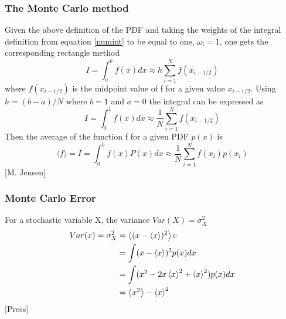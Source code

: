 \documentclass[%
reprint,
amsmath,amssymb,
aps,
]{revtex4-1}
\begin{document}
\subsubsection*{The Monte Carlo method} \noindent 
Given the above definition of the PDF and taking the weights of the integral definition from equation \ref{numint} to be equal to one, $\omega_i = 1$, one gets the corresponding rectangle method
\begin{equation*}
I = \int_{a}^{b}f(x)dx \approx h\sum_{i=1}^{N}f(x_{i-1/2})
\end{equation*} 
where $f(x_{i-1/2})$ is the midpoint value of f for a given value $x_{i-1/2}$. Using $h = (b-a)/N$ where $b=1$ and $a=0$ the integral can be expressed as
\begin{equation*}
I = \int_{0}^{1}f(x)dx \approx \dfrac{1}{N}\sum_{i=1}^{N}f(x_{i-1/2})
\end{equation*} 
Then the average of the function f for a given PDF $p(x)$ is
\begin{equation}\label{mcint}
\langle f \rangle = I = \int_{a}^{b}f(x)P(x)dx \approx \dfrac{1}{N}\sum_{i=1}^{N}f(x_i)p(x_i) 
\end{equation}
[M. Jensen]

\subsubsection{Monte Carlo Error}
For a stochastic variable X, the variance $Var(X) = \sigma_X^2 $
\begin{align}\label{var}
	Var(x) = \sigma_X^2 &= \expval{(x-\expval{x})^2} c\nonumber \\
	&= \int(x-\expval{x})^2p(x)dx\nonumber\\
	&= \int(x^2-2x\expval{x}^2+ \expval{x}^2)p(x)dx\nonumber\\
	& = \expval{x^2} - \expval{x}^2
\end{align}
[Press]
\end{document}
